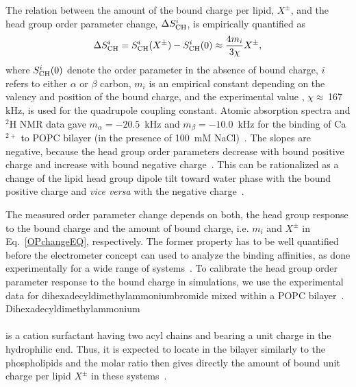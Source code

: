 \documentclass[aip,jcp,twocolumn]{revtex4}
\begin{document}
The relation between the amount of the bound charge per lipid,  $X^\pm$, and
the head group order parameter change, $\Delta S_{\rm{CH}}^{i}$,
is empirically quantified as~\cite{seelig87,ferreira16}
\begin{equation}\label{OPchangeEQ}
  \Delta S_{\rm{CH}}^{i}= S_{\rm{CH}}^{i}(X^\pm)-S_{\rm{CH}}^{i}(0) \approx \frac{4m_i }{3\chi}X^\pm,
\end{equation}
where $S_{\rm{CH}}^{i}(0)$ denote the order parameter in the absence of bound charge,
$i$ refers to either $\alpha$ or $\beta$ carbon,
$m_i$ is an empirical constant depending on the valency and position of the bound charge,
and the experimental value \cite{seelig77,davis83}, $\chi \approx$\,167\,kHz, is used for the quadrupole coupling constant.
Atomic absorption spectra and $^2$H NMR data gave
$m_\alpha=-20.5$~kHz  and $m_\beta=-10.0$~kHz for the binding of
Ca$^{2+}$ to POPC bilayer (in the presence of 100~mM NaCl)~\cite{altenbach84,ollila16,catte16}.
The slopes are negative, because the head group order parameters
decrease with bound positive charge and increase with bound negative
charge~\cite{ollila16,catte16}. This can be rationalized as a change
of the lipid head group dipole tilt toward water phase with the bound positive
charge and {\it vice versa} with the negative charge~\cite{seelig87}. 

The measured order parameter change depends on both, the head group response 
to the bound charge and the amount of bound charge, i.e. $m_i$ and $X^\pm$
in Eq.~\ref{OPchangeEQ}, respectively. The former property has to be
well quantified before the electrometer concept can used to 
analyze the binding affinities, as done experimentally for a wide range
of systems~\cite{seelig87,beschiasvili91}. To calibrate 
the head group order parameter response to the bound charge in simulations,
we use the experimental data for dihexadecyldimethylammoniumbromide %
mixed within a POPC bilayer~\cite{scherer89}. Dihexadecyldimethylammonium\\[0.5cm]
\vspace{0.5cm} \\
is a cation surfactant having two acyl chains and bearing a unit
charge in the hydrophilic end. Thus, it is expected to locate
in the bilayer similarly to the phospholipids and the molar ratio then 
gives directly the amount of bound unit charge per lipid $X^\pm$ in these systems~\cite{scherer89}.
\end{document}
